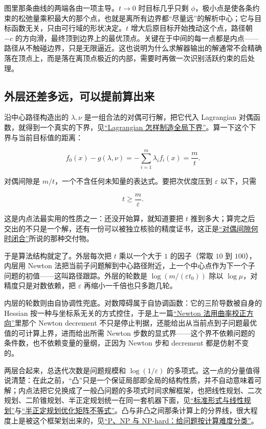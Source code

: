 图里那条曲线的两端各由一项主导。\(t\to0\) 时目标几乎只剩 \(\phi\)，极小点是使各条约束的松弛量乘积最大的那个点，也就是离所有边界都``尽量远''的解析中心；它与目标函数无关，只由可行域的形状决定。\(t\) 增大后原目标开始拽动这个点，路径朝 \(-c\) 的方向滑，最终顶到边界上的最优顶点。关键在于中间的每一点都是内点——路径从不触碰边界，只是无限逼近。这也说明为什么求解器输出的解通常不会精确落在顶点上，而是落在离顶点极近的内部，需要时再做一次识别活跃约束的后处理。

\subsection{外层还差多远，可以提前算出来}

沿中心路径构造出的 \(\lambda,\nu\) 是一组合法的对偶可行解，把它代入 Lagrangian 对偶函数，就得到一个真实的下界，见\hyperref[sec:09-Convex-Optimization/05-Duality/01]{``Lagrangian 怎样制造全局下界''}。算一下这个下界与当前目标值的距离：

\[
f_0(x)-g(\lambda,\nu)=-\sum_{i=1}^m\lambda_if_i(x)=\frac{m}{t}.
\]

对偶间隙是 \(m/t\)，一个不含任何未知量的表达式。要把次优度压到 \(\varepsilon\) 以下，只需

\[
t\ge\frac{m}{\varepsilon}.
\]

这是内点法最实用的性质之一：还没开始算，就知道要把 \(t\) 推到多大；算完之后交出的不只是一个解，还有一份可以被独立核验的精度证书，这正是\hyperref[sec:09-Convex-Optimization/05-Duality/02]{``对偶间隙何时闭合''}所说的那种交付物。

于是算法结构就定了。外层每次把 \(t\) 乘以一个大于 \(1\) 的因子（常取 \(10\) 到 \(100\)），内层用 Newton 法把当前子问题解到中心路径附近，上一个中心点作为下一个子问题的初值——这叫路径跟踪。外层的轮数是 \(\log(m/(\varepsilon t_0))\) 除以 \(\log\mu\)，对精度只是对数依赖，把 \(\varepsilon\) 再缩小一千倍也只多跑几轮。

内层的轮数则由自协调性兜底。对数障碍属于自协调函数：它的三阶导数被自身的 Hessian 按一种与坐标系无关的方式控住，于是上一篇\hyperref[sec:09-Convex-Optimization/06-Optimization-Algorithms/02]{``Newton 法用曲率校正方向''}里那个 Newton decrement 不只是停止判据，还能给出从当前点到子问题最优值的可计算上界，进而给出所需 Newton 步数的显式界——这个界不依赖问题的条件数，也不依赖变量的量纲，正因为 Newton 步和 decrement 都是仿射不变的。

两层合起来，总迭代次数是问题规模和 \(\log(1/\varepsilon)\) 的多项式。这一点的分量值得说清楚：在此之前，``凸''只是一个保证局部即全局的结构性质，并不自动意味着可解；内点法把它兑换成了一般凸问题的多项式时间求解框架，也把线性规划、二次规划、二阶锥规划、半正定规划统一在同一套机器下面，见\hyperref[sec:09-Convex-Optimization/04-Convex-Problems/01]{``标准形式与线性规划''}与\hyperref[sec:09-Convex-Optimization/04-Convex-Problems/04]{``半正定规划优化矩阵不等式''}。凸与非凸之间那条计算上的分界线，很大程度上是被这个框架划出来的，见\hyperref[sec:09-Convex-Optimization/09-Complexity-and-Approximation/01]{``P、NP 与 NP-hard：给问题按计算难度分类''}。

